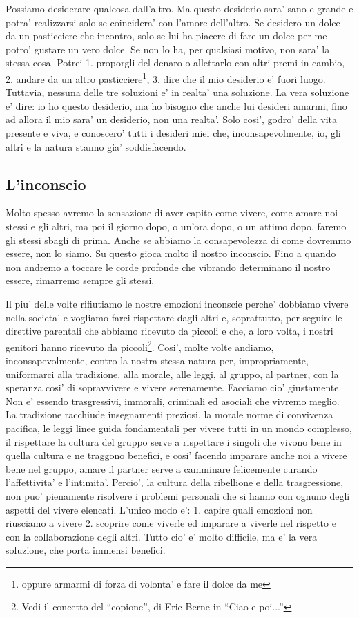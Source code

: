 Possiamo desiderare qualcosa dall'altro. Ma questo desiderio sara' sano e grande e potra' realizzarsi solo se coincidera' con l'amore dell'altro. Se desidero un dolce da un pasticciere che incontro, solo se lui ha piacere di fare un dolce per me potro' gustare un vero dolce. Se non lo ha, per qualsiasi motivo, non sara' la stessa cosa. Potrei 1. proporgli del denaro o allettarlo con altri premi in cambio, 2. andare da un altro pasticciere\footnote{oppure armarmi di forza di volonta' e fare il dolce da me}, 3. dire che il mio desiderio e' fuori luogo. Tuttavia, nessuna delle tre soluzioni e' in realta' una soluzione. La vera soluzione e' dire: io ho questo desiderio, ma ho bisogno che anche lui desideri amarmi, fino ad allora il mio sara' un desiderio, non una realta'. Solo cosi', godro' della vita presente e viva, e conoscero' tutti i desideri miei che, inconsapevolmente, io, gli altri e la natura stanno gia' soddisfacendo.

\subsection{L'inconscio}

Molto spesso avremo la sensazione di aver capito come vivere, come amare noi stessi e gli altri, ma poi il giorno dopo, o un'ora dopo, o un attimo dopo, faremo gli stessi sbagli di prima. Anche se abbiamo la consapevolezza di come dovremmo essere, non lo siamo. Su questo gioca molto il nostro inconscio. Fino a quando non andremo a toccare le corde profonde che vibrando determinano il nostro essere, rimarremo sempre gli stessi. 

Il piu' delle volte rifiutiamo le nostre emozioni inconscie perche' dobbiamo vivere nella societa' e vogliamo farci rispettare dagli altri e, soprattutto, per seguire le direttive parentali che abbiamo ricevuto da piccoli e che, a loro volta, i nostri genitori hanno ricevuto da piccoli\footnote{Vedi il concetto del ``copione'', di Eric Berne in ``Ciao e poi...''}. Cosi', molte volte andiamo, inconsapevolmente, contro la nostra stessa natura per, impropriamente, uniformarci alla tradizione, alla morale, alle leggi, al gruppo, al partner, con la speranza cosi' di sopravvivere e vivere serenamente. Facciamo cio' giustamente. Non e' essendo trasgressivi, immorali, criminali ed asociali che vivremo meglio. La tradizione racchiude insegnamenti preziosi, la morale norme di convivenza pacifica, le leggi linee guida fondamentali per vivere tutti in un mondo complesso, il rispettare la cultura del gruppo serve a rispettare i singoli che vivono bene in quella cultura e ne traggono benefici, e cosi' facendo imparare anche noi a vivere bene nel gruppo, amare il partner serve a camminare felicemente curando l'affettivita' e l'intimita'. Percio', la cultura della ribellione e della trasgressione, non puo' pienamente risolvere i problemi personali che si hanno con ognuno degli aspetti del vivere elencati. L'unico modo e': 1. capire quali emozioni non riusciamo a vivere 2. scoprire come viverle ed imparare a viverle nel rispetto e con la collaborazione degli altri. Tutto cio' e' molto difficile, ma e' la vera soluzione, che porta immensi benefici. 

